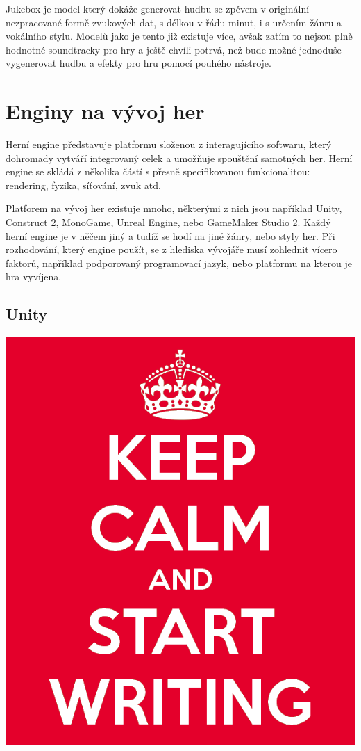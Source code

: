 Jukebox \cite{Dhariwal2020JukeboxAG} je model který dokáže generovat hudbu se zpěvem v originální nezpracované formě zvukových dat, s délkou v řádu minut, i s určením žánru a vokálního stylu. Modelů jako je tento již existuje více, avšak zatím to nejsou plně hodnotné soundtracky pro hry a ještě chvíli potrvá, než bude možné jednoduše vygenerovat hudbu a efekty pro hru pomocí pouhého nástroje.

\pagebreak

\chapter{Enginy na vývoj her}
\label{engines}
Herní engine představuje platformu složenou z interagujícího softwaru, který dohromady vytváří integrovaný celek a umožňuje spouštění samotných her. Herní engine se skládá z několika částí s přesně specifikovanou funkcionalitou: rendering, fyzika, síťování, zvuk atd. \cite{nilson2007game} 

Platforem na vývoj her existuje mnoho, některými z nich jsou například Unity, Construct 2, MonoGame, Unreal Engine, nebo GameMaker Studio 2. Každý herní engine je v něčem jiný a tudíž se hodí na jiné žánry, nebo styly her. Při rozhodování, který engine použít, se z hlediska vývojáře musí zohlednit vícero faktorů, například podporovaný programovací jazyk, nebo platformu na kterou je hra vyvíjena. \cite{vohera2021game}
\section{Unity}
\label{unity}
\includegraphics[scale=0.3]{obrazky-figures/keep-calm.png}

